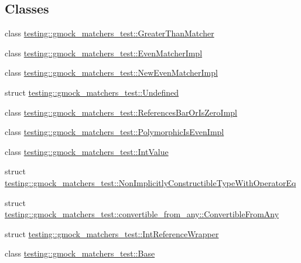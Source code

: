 \subsection*{Classes}
\begin{DoxyCompactItemize}
\item 
class \mbox{\hyperlink{classtesting_1_1gmock__matchers__test_1_1_greater_than_matcher}{testing\+::gmock\+\_\+matchers\+\_\+test\+::\+Greater\+Than\+Matcher}}
\item 
class \mbox{\hyperlink{classtesting_1_1gmock__matchers__test_1_1_even_matcher_impl}{testing\+::gmock\+\_\+matchers\+\_\+test\+::\+Even\+Matcher\+Impl}}
\item 
class \mbox{\hyperlink{classtesting_1_1gmock__matchers__test_1_1_new_even_matcher_impl}{testing\+::gmock\+\_\+matchers\+\_\+test\+::\+New\+Even\+Matcher\+Impl}}
\item 
struct \mbox{\hyperlink{structtesting_1_1gmock__matchers__test_1_1_undefined}{testing\+::gmock\+\_\+matchers\+\_\+test\+::\+Undefined}}
\item 
class \mbox{\hyperlink{classtesting_1_1gmock__matchers__test_1_1_references_bar_or_is_zero_impl}{testing\+::gmock\+\_\+matchers\+\_\+test\+::\+References\+Bar\+Or\+Is\+Zero\+Impl}}
\item 
class \mbox{\hyperlink{classtesting_1_1gmock__matchers__test_1_1_polymorphic_is_even_impl}{testing\+::gmock\+\_\+matchers\+\_\+test\+::\+Polymorphic\+Is\+Even\+Impl}}
\item 
class \mbox{\hyperlink{classtesting_1_1gmock__matchers__test_1_1_int_value}{testing\+::gmock\+\_\+matchers\+\_\+test\+::\+Int\+Value}}
\item 
struct \mbox{\hyperlink{structtesting_1_1gmock__matchers__test_1_1_non_implicitly_constructible_type_with_operator_eq}{testing\+::gmock\+\_\+matchers\+\_\+test\+::\+Non\+Implicitly\+Constructible\+Type\+With\+Operator\+Eq}}
\item 
struct \mbox{\hyperlink{structtesting_1_1gmock__matchers__test_1_1convertible__from__any_1_1_convertible_from_any}{testing\+::gmock\+\_\+matchers\+\_\+test\+::convertible\+\_\+from\+\_\+any\+::\+Convertible\+From\+Any}}
\item 
struct \mbox{\hyperlink{structtesting_1_1gmock__matchers__test_1_1_int_reference_wrapper}{testing\+::gmock\+\_\+matchers\+\_\+test\+::\+Int\+Reference\+Wrapper}}
\item 
class \mbox{\hyperlink{classtesting_1_1gmock__matchers__test_1_1_base}{testing\+::gmock\+\_\+matchers\+\_\+test\+::\+Base}}
\item 

\end{DoxyCompactItemize}

